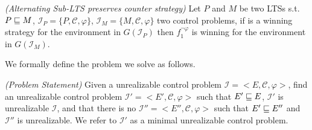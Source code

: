 \begin{theorem}\emph{(Alternating Sub-LTS preserves counter strategy)}\label{theorem:theo.preserves-non-realizability}
Let $P$ and $M$ be two LTSs s.t. $P \sqsubseteq M$, 
$\mathcal{I}_P = \lbrace P, \mathcal{C}, \varphi \rbrace$,
$\mathcal{I}_M = \lbrace M, \mathcal{C}, \varphi \rbrace$
two control problems, if
 \counterS is a winning strategy for
the environment in $G(\mathcal{I}_P)$ 
then $f_1^{\neg \varphi}$ is winning for the environment in
$G(\mathcal{I}_M)$.
\end{theorem}


%

We formally define the problem we solve as follows.

\begin{definition}\label{def:ProblemStatement}\emph{(Problem Statement)}
Given a unrealizable control problem $\mathcal{I} = <E, \mathcal{C}, \varphi>$, find an unrealizable control problem $\mathcal{I'} = <E', \mathcal{C}, \varphi>$ such that $E' \sqsubseteq E$, $\mathcal{I'}$ is unrealizable $\mathcal{I}$, and that there is no $\mathcal{I''} = <E'', \mathcal{C}, \varphi>$ such that $E' \sqsubseteq E''$ and $\mathcal{I''}$ is unrealizable. We refer to $\mathcal{I'}$ as a minimal unrealizable control problem.
\end{definition}

